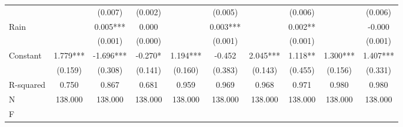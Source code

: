 {\begin{tabular}{l*{9}{c}}
                    &               &     (0.007)   &     (0.002)   &               &     (0.005)   &               &     (0.006)   &               &     (0.006)   \\
Rain                &               &       0.005***&       0.000   &               &       0.003***&               &       0.002** &               &      -0.000   \\
                    &               &     (0.001)   &     (0.000)   &               &     (0.001)   &               &     (0.001)   &               &     (0.001)   \\
Constant            &       1.779***&      -1.696***&      -0.270*  &       1.194***&      -0.452   &       2.045***&       1.118** &       1.300***&       1.407***\\
                    &     (0.159)   &     (0.308)   &     (0.141)   &     (0.160)   &     (0.383)   &     (0.143)   &     (0.455)   &     (0.156)   &     (0.331)   \\
\hline
R-squared           &       0.750   &       0.867   &       0.681   &       0.959   &       0.969   &       0.968   &       0.971   &       0.980   &       0.980   \\
N                   &     138.000   &     138.000   &     138.000   &     138.000   &     138.000   &     138.000   &     138.000   &     138.000   &     138.000   \\
F                   &               &               &               &               &               &               &               &               &               \\
\hline\hline
\end{tabular}
}
